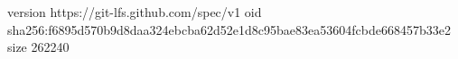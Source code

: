 version https://git-lfs.github.com/spec/v1
oid sha256:f6895d570b9d8daa324ebcba62d52e1d8c95bae83ea53604fcbde668457b33e2
size 262240

